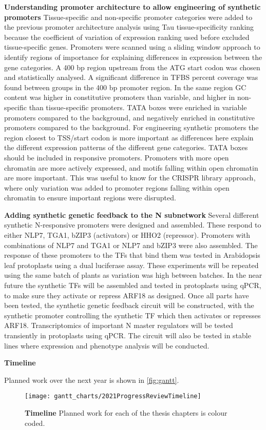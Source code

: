 \documentclass[../main.tex]{subfiles}
\begin{document}
\textbf{Understanding promoter architecture to allow engineering of synthetic promoters}
Tissue-specific and non-specific promoter categories were added to the previous promoter architecture analysis using Tau tissue-specificity ranking because the coefficient of variation of expression ranking used before excluded tissue-specific genes. Promoters were scanned using a sliding window approach to identify regions of importance for explaining differences in expression between the gene categories. A 400 bp region upstream from the ATG start codon was chosen and statistically analysed. A significant difference in TFBS percent coverage was found between groups in the 400 bp promoter region. In the same region GC content was higher in constitutive promoters than variable, and higher in non-specific than tissue-specific promoters. TATA boxes were enriched in variable promoters compared to the background, and negatively enriched in constitutive promoters compared to the background.
For engineering synthetic promoters the region closest to TSS/start codon is more important as differences here explain the different expression patterns of the different gene categories. TATA boxes should be included in responsive promoters. Promoters with more open chromatin are more actively expressed, and motifs falling within open chromatin are more important. This was useful to know for the CRISPR library approach, where only variation was added to promoter regions falling within open chromatin to ensure important regions were disrupted.

\textbf{Adding synthetic genetic feedback to the N subnetwork}
Several different synthetic N-responsive promoters were designed and assembled. These respond to either NLP7, TGA1, bZIP3 (activators) or HHO2 (repressor). Promoters with combinations of NLP7 and TGA1 or NLP7 and bZIP3 were also assembled. The response of these promoters to the TFs that bind them was tested in Arabidopsis leaf protoplasts using a dual luciferase assay. These experiments will be repeated using the same batch of plants as variation was high between batches. In the near future the synthetic TFs will be assembled and tested in protoplasts using qPCR, to make sure they activate or repress ARF18 as designed. Once all parts have been tested, the synthetic genetic feedback circuit will be constructed, with the synthetic promoter controlling the synthetic TF which then activates or represses ARF18. Transcriptomics of important N master regulators will be tested transiently in protoplasts using qPCR. The circuit will also be tested in stable lines where expression and phenotype analysis will be conducted.

\textbf{Timeline}

Planned work over the next year is shown in \autoref{fig:gantt}.
\begin{sidewaysfigure}[hbt!]
	\begin{center}
		\capstart
		\texttt{[image: gantt\_charts/2021ProgressReviewTimeline]}
		\caption{
			\textbf{Timeline}
			Planned work for each of the thesis chapters is colour coded.            
			\label{fig:gantt}
		}
	\end{center}
\end{sidewaysfigure}
\end{document}
